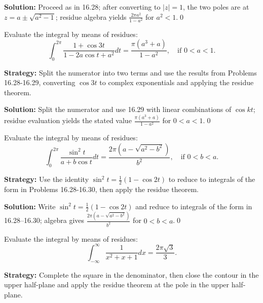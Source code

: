 \bigskip\noindent\textbf{Solution:}
Proceed as in 16.28; after converting to $|z|=1$, the two poles are at $z=a\pm\sqrt{a^2-1}$; residue algebra yields $\frac{2\pi a^2}{1-a^2}$ for $a^2<1$.\qed


\begin{problembox}
\begin{problemstatement}
Evaluate the integral by means of residues:
\[ \int_0^{2\pi} \frac{1 + \cos 3t}{1 - 2a \cos t + a^2} dt = \frac{\pi (a^3 + a)}{1 - a^2}, \quad \text{if } 0 < a < 1. \]
\end{problemstatement}
\end{problembox}

\noindent\textbf{Strategy:} Split the numerator into two terms and use the results from Problems 16.28-16.29, converting \( \cos 3t \) to complex exponentials and applying the residue theorem.

\bigskip\noindent\textbf{Solution:}
Split the numerator and use 16.29 with linear combinations of $\cos kt$; residue evaluation yields the stated value $\frac{\pi(a^3+a)}{1-a^2}$ for $0<a<1$.\qed


\begin{problembox}
\begin{problemstatement}
Evaluate the integral by means of residues:
\[ \int_0^{2\pi} \frac{\sin^2 t}{a + b \cos t} dt = \frac{2\pi (a - \sqrt{a^2 - b^2})}{b^2}, \quad \text{if } 0 < b < a. \]
\end{problemstatement}
\end{problembox}

\noindent\textbf{Strategy:} Use the identity \( \sin^2 t = \frac{1}{2}(1 - \cos 2t) \) to reduce to integrals of the form in Problems 16.28-16.30, then apply the residue theorem.

\bigskip\noindent\textbf{Solution:}
Write $\sin^2 t=\tfrac{1}{2}(1-\cos 2t)$ and reduce to integrals of the form in 16.28–16.30; algebra gives $\frac{2\pi(a-\sqrt{a^2-b^2})}{b^2}$ for $0<b<a$.\qed


\begin{problembox}
\begin{problemstatement}
Evaluate the integral by means of residues:
\[ \int_{-\infty}^{\infty} \frac{1}{x^2 + x + 1} dx = \frac{2\pi \sqrt{3}}{3}. \]
\end{problemstatement}
\end{problembox}

\noindent\textbf{Strategy:} Complete the square in the denominator, then close the contour in the upper half-plane and apply the residue theorem at the pole in the upper half-plane.

